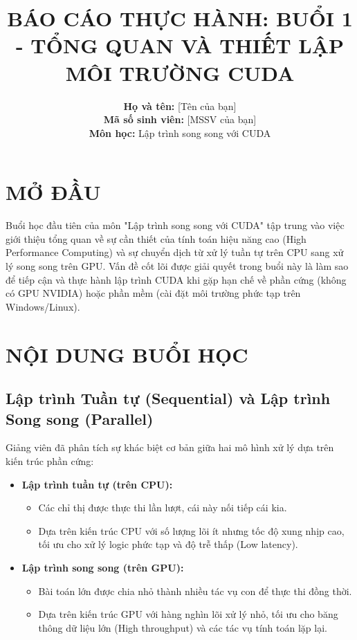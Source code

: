 \documentclass[12pt,a4paper]{article}
\title{\textbf{BÁO CÁO THỰC HÀNH: BUỔI 1 - TỔNG QUAN VÀ THIẾT LẬP MÔI TRƯỜNG CUDA}}
\author{
    \textbf{Họ và tên:} [Tên của bạn] \\
    \textbf{Mã số sinh viên:} [MSSV của bạn] \\
    \textbf{Môn học:} Lập trình song song với CUDA
}
\date{}
\begin{document}
\maketitle

\section{MỞ ĐẦU}
Buổi học đầu tiên của môn "Lập trình song song với CUDA" tập trung vào việc giới thiệu tổng quan về sự cần thiết của tính toán hiệu năng cao (High Performance Computing) và sự chuyển dịch từ xử lý tuần tự trên CPU sang xử lý song song trên GPU. Vấn đề cốt lõi được giải quyết trong buổi này là làm sao để tiếp cận và thực hành lập trình CUDA khi gặp hạn chế về phần cứng (không có GPU NVIDIA) hoặc phần mềm (cài đặt môi trường phức tạp trên Windows/Linux).

\section{NỘI DUNG BUỔI HỌC}

\subsection{Lập trình Tuần tự (Sequential) và Lập trình Song song (Parallel)}
Giảng viên đã phân tích sự khác biệt cơ bản giữa hai mô hình xử lý dựa trên kiến trúc phần cứng:

\begin{itemize}
    \item \textbf{Lập trình tuần tự (trên CPU):}
    \begin{itemize}
        \item Các chỉ thị được thực thi lần lượt, cái này nối tiếp cái kia.
        \item Dựa trên kiến trúc CPU với số lượng lõi ít nhưng tốc độ xung nhịp cao, tối ưu cho xử lý logic phức tạp và độ trễ thấp (Low latency).
    \end{itemize}
    
    \item \textbf{Lập trình song song (trên GPU):}
    \begin{itemize}
        \item Bài toán lớn được chia nhỏ thành nhiều tác vụ con để thực thi đồng thời.
        \item Dựa trên kiến trúc GPU với hàng nghìn lõi xử lý nhỏ, tối ưu cho băng thông dữ liệu lớn (High throughput) và các tác vụ tính toán lặp lại.
    \end{itemize}
\end{itemize}
\end{document}
